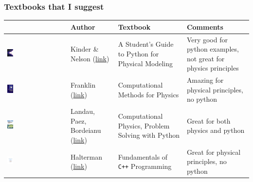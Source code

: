 \documentclass[hyperref={colorlinks=true}]{beamer}
\begin{document}
\begin{frame}[shrink=15]
  \frametitle{Textbooks that I suggest}

  \begin{table}[htbp]
  \centering
  \begin{tabular}{b{} b{3cm} b{5cm} b{3.5cm} }
    \hline
     & Author & Textbook & Comments \\ 
    \hline
    \includegraphics[width=0.10\textwidth]{Textbook-KN.png} & Kinder \& Nelson (\href{http://physicalmodelingwithpython.blogspot.com/}{link}) & A Student's Guide to Python for Physical Modeling & Very good for python examples, not great for physics principles \\ 
    \includegraphics[width=0.10\textwidth]{Textbook-Franklin.jpg} & Franklin (\href{http://www.reed.edu/physics/courses/P367.F14oldX!/downloads/index.html}{link}) & Computational Methods for Physics & Amazing for physical principles, no python \\ 
    \includegraphics[width=0.10\textwidth]{Textbook-LPB.jpg} & Landau, Paez, Bordeianu (\href{http://physics.oregonstate.edu/~landaur/Books/CPbook/Codes/}{link})  & Computational Physics, Problem Solving with Python & Great for both physics and python \\ 
    \includegraphics[width=0.10\textwidth]{Textbook-Halterman.pdf} & Halterman (\href{http://python.cs.southern.edu/cppbook/progcpp.pdf}{link}) & Fundamentals of \texttt{C++} Programming & Great for physical principles, no python \\ 
    \hline
  \end{tabular}
  \end{table}
  
  
\end{frame}
\end{document}
